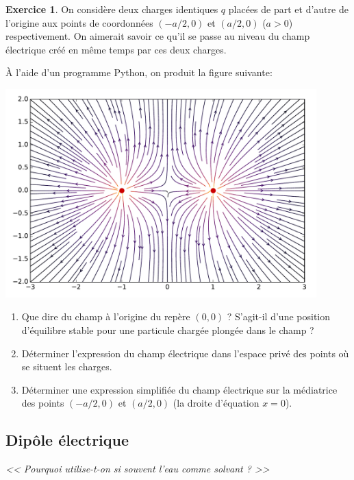 \documentclass{article}
\theoremstyle{definition}
\newtheorem{exo}{Exercice}
\theoremstyle{remark}
\begin{document}
\begin{exo}
	On considère deux charges identiques $q$ placées de part et d'autre de l'origine aux points de coordonnées $(-a/2,0)$ et $(a/2,0)$ ($a>0$) respectivement. On aimerait savoir ce qu'il se passe au niveau du champ électrique créé en même temps par ces deux charges.
	
	À l'aide d'un programme \textsf{Python}, on produit la figure suivante:
	
	\begin{center}
		\includegraphics[width=0.9\textwidth]{parts/electrostat/Champ_exo1.pdf}
	\end{center}
	
	\begin{enumerate}
		\item Que dire du champ à l'origine du repère $(0,0)$ ? S'agit-il d'une position d'équilibre stable pour une particule chargée plongée dans le champ ?
		\item Déterminer l'expression du champ électrique dans l'espace privé des points où se situent les charges.
		\item Déterminer une expression simplifiée du champ électrique sur la médiatrice des points $(-a/2,0)$ et $(a/2,0)$ (la droite d'équation $x=0$).
	\end{enumerate}
\end{exo}

\subsection{Dipôle électrique}

\begin{center}
	\textit{<< Pourquoi utilise-t-on si souvent l'eau comme solvant ? >>}
\end{center}
\end{document}
